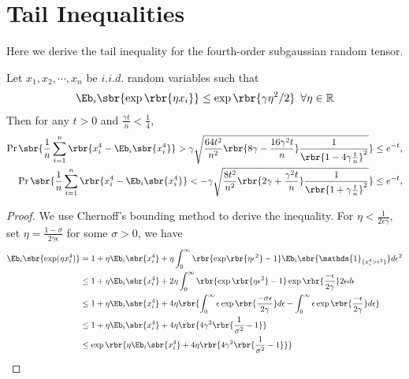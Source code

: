 \documentclass[twoside,11pt]{article}
\begin{document}
{\section{Tail Inequalities}
Here we derive the tail inequality for the fourth-order subgaussian random tensor.
\begin{lemma}
  \label{lem:normal4}
  Let $x_1, x_2, \cdots,x_n$ be $i.i.d.$ random variables such that 
  \begin{align}
    \Eb_i \sbr{\exp\rbr{\eta x_i}} \leq \exp\rbr{\gamma \eta^2/2}\,\,\,  \forall \eta \in \mathbb{R}
  \end{align} 
  Then for any $t > 0$ and $\frac{\gamma t}{n} < \frac{1}{4}$,
  \begin{align}
  \label{eq:tail}
    \Pr \sbr{\frac{1}{n} \sum \limits_{i=1}^n \rbr{x_i^4 - \Eb_i \sbr{x_i^4}} > \gamma \sqrt{\frac{64 t^2 }{n^2} \rbr{ 8\gamma - \frac{16 \gamma^2 t}{n} } \frac{1}{\rbr{1-4\gamma \frac{t}{n}}^2} } } \leq e^{-t},\\
   \Pr \sbr{\frac{1}{n} \sum \limits_{i=1}^n \rbr{x_i^4 - \Eb_i \sbr{x_i^4}} < - \gamma  \sqrt{\frac{8 t^2 }{n^2} \rbr{ 2\gamma + \frac{ \gamma^2 t}{n} } \frac{1}{\rbr{1+\gamma \frac{t}{n}}^2} }} \leq e^{-t},
  \end{align}
\end{lemma}
\begin{proof}
  We use Chernoff's bounding method to derive the inequality. For $\eta < \frac{1}{2\epsilon\gamma}$, set $\eta = \frac{1-\sigma}{2\gamma\epsilon}$ for some $\sigma > 0$, we have
  \begin{align}
    \Eb_i \sbr{\mathrm{exp}(\eta x_i^4)} &= 1+\eta \Eb_i \sbr{x_i^4} + \eta \int_{0}^{\infty} \rbr{\mathrm{exp}\rbr{\eta \epsilon^2}-1} \Eb_i\sbr{\mathds{1}_{\{ x_i^4 > \epsilon^2 \}}} d \epsilon^2\\
    & \leq  1 + \eta \Eb_i \sbr{x_i^4} + 2\eta  \int_{0}^{\infty} \rbr{\exp \rbr{\eta \epsilon^2}-1} \exp \rbr{\frac{-\epsilon}{2\gamma}}  2\epsilon d \epsilon\\
    & \leq 1 + \eta \Eb_i \sbr{x_i^4} + 4 \eta \rbr{\int_{0}^{\infty} \epsilon \exp \rbr{\frac{-\sigma \epsilon}{2\gamma} } d\epsilon - \int_{0}^{\infty} \epsilon \exp \rbr{\frac{- \epsilon}{2\gamma} } d\epsilon } \\
    & \leq 1 + \eta \Eb_i \sbr{x_i^4} + 4 \eta \rbr{ 4 \gamma^2 \rbr{\frac{1}{\sigma^2}-1 } } \\
    & \leq \exp \rbr{ \eta \Eb_i \sbr{x_i^4} + 4 \eta \rbr{ 4 \gamma^2 \rbr{\frac{1}{\sigma^2}-1 } }  }
  \end{align}

\end{proof}}
\end{document}

